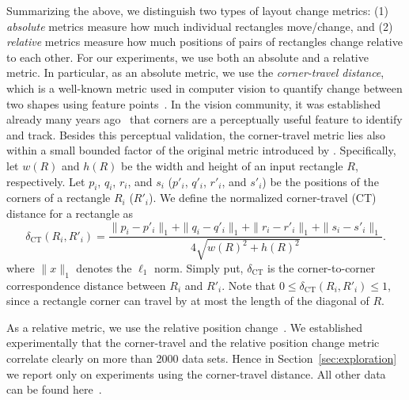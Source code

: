 Summarizing the above, we distinguish two types of layout change metrics: (1) \emph{absolute} metrics measure how much individual rectangles move/change, and (2) \emph{relative} metrics measure how much positions of pairs of rectangles change relative to each other. For our experiments, we use both an absolute and a relative metric. In particular, as an absolute metric, we use the \emph{corner-travel distance}, which is a well-known metric used in computer vision to quantify change between two shapes using feature points~\citep{tuytelaars07,szeliski10}. In the vision community, it was established already many years ago~\citep{shi1994good,biederman87} that corners are a perceptually useful feature to identify and track.
Besides this perceptual validation, the corner-travel metric lies also within a small bounded factor of the original metric introduced by \cite{ordered}. Specifically, let $w(R)$ and $h(R)$ be the width and height of an input rectangle $R$, respectively. Let $p_i$, $q_i$, $r_i$, and $s_i$ ($p'_i$, $q'_i$, $r'_i$, and $s'_i$) be the positions of the corners of a rectangle $R_i$ ($R'_i$). We define the normalized corner-travel (CT) distance for a rectangle as
%
\begin{equation}
\delta_{\text{CT}}(R_i, R'_i) = \frac{\|p_i - p'_i\|_1 + \|q_i - q'_i\|_1 + \|r_i - r'_i\|_1 + \|s_i - s'_i\|_1}{4 \sqrt{w(R)^2 + h(R)^2}}.
\label{eqn:delta_ct}
\end{equation}
%
where $\|x\|_1$ denotes the $\ell_1$ norm. Simply put, $\delta_{\text{CT}}$ is the corner-to-corner correspondence distance between $R_i$ and $R'_i$. Note that $0 \leq \delta_{\text{CT}}(R_i, R'_i) \leq 1$, since a rectangle corner can travel by at most the length of the diagonal of $R$.

As a relative metric, we use the relative position change~\citep{sondag17}. We established experimentally that the corner-travel and the relative position change metric correlate clearly on more than 2000 data sets. Hence in Section~\ref{sec:exploration} we report only on experiments using the corner-travel distance. All other data can be found here~\citep{URLTreemaps}.

